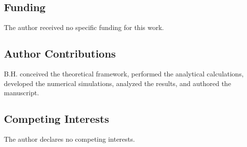 \documentclass[11pt]{article}
\begin{document}
\subsection*{Funding}
The author received no specific funding for this work.

\subsection*{Author Contributions}
B.H. conceived the theoretical framework, performed the analytical calculations, developed the numerical simulations, analyzed the results, and authored the manuscript.

\subsection*{Competing Interests}
The author declares no competing interests.
\end{document}
